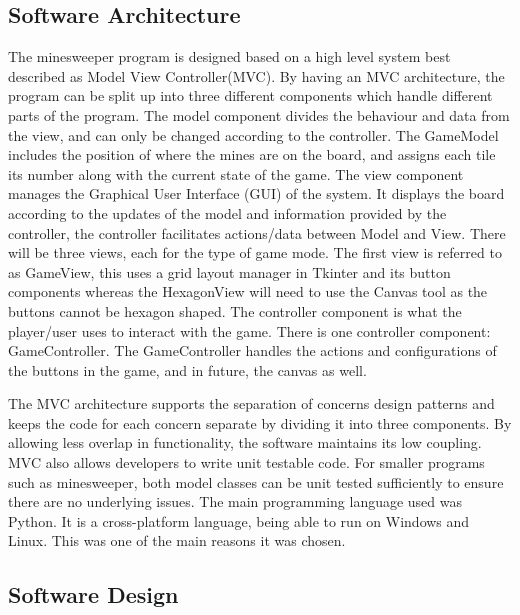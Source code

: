 \documentclass[12pt, a4]{report}
\begin{document}
	\subsection{Software Architecture}
	
	\par The minesweeper program is designed based on a high level system best described as Model View Controller(MVC). By having an MVC architecture, the program can be split up into three different components which handle different parts of the program. The model component divides the behaviour and data from the view, and can only be changed according to the controller. The GameModel includes the position of where the mines are on the board, and assigns each tile its number along with the current state of the game. The view component manages the Graphical User Interface (GUI) of the system. It displays the board according to the updates of the model and information provided by the controller, the controller facilitates actions/data between Model and View. There will be three views, each for the type of game mode. The first view is referred to as GameView, this uses a grid layout manager in Tkinter and its button components whereas the HexagonView will need to use the Canvas tool as the buttons cannot be hexagon shaped. The controller component is what the player/user uses to interact with the game. There is one controller component: GameController. The GameController handles the actions and configurations of the buttons in the game, and in future, the canvas as well.
	\newline \par 
	The MVC architecture supports the separation of concerns design patterns and keeps the code for each concern separate by dividing it into three components. By allowing less overlap in functionality, the software maintains its low coupling. MVC also allows developers to write unit testable code. For smaller programs such as minesweeper, both model classes can be unit tested sufficiently to ensure there are no underlying issues. The main programming language used was Python. It is a cross-platform language, being able to run on Windows and Linux. This was one of the main reasons it was chosen. 

	\pagebreak
	
	\subsection{Software Design}
\end{document}
